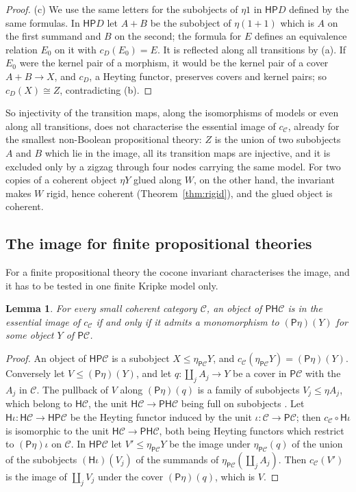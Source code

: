 \documentclass[11pt]{amsart}
\newtheorem{lem}[thm]{Lemma}
\theoremstyle{definition}
\newcommand{\PP}{\mathsf P}
\newcommand{\HH}{\mathsf H}
\newcommand{\cC}{\mathcal C}
\begin{document}
\begin{proof}
(c) We use the same letters for the subobjects of $\eta1$ in
$\HH\PP D$ defined by the same formulas. In $\HH\PP D$ let $A+B$ be the
subobject of $\eta(1+1)$ which is $A$ on the first summand and $B$ on
the second; the formula for $E$ defines an equivalence relation $E_0$
on it with $c_D(E_0)=E$. It is reflected along all transitions by (a).
If $E_0$ were the kernel pair of a morphism, it would be the kernel
pair of a cover $A+B\to X$, and $c_D$, a Heyting functor, preserves
covers and kernel pairs; so $c_D(X)\cong Z$, contradicting (b).
\end{proof}

So injectivity of the transition maps, along the isomorphisms of
models or even along all transitions, does not characterise the
essential image of $c_\cC$, already for the smallest non-Boolean
propositional theory: $Z$ is the union of two subobjects $A$ and $B$ which lie in the
image, all its transition maps are injective, and it is excluded only
by a zigzag through four nodes carrying the same model. For two copies
of a coherent object $\eta Y$ glued along $W$, on the other hand, the
invariant makes $W$ rigid, hence coherent (Theorem~\ref{thm:rigid}),
and the glued object is coherent.

\subsection*{The image for finite propositional theories}
For a finite propositional theory the cocone invariant characterises
the image, and it has to be tested in one finite Kripke model only.

\begin{lem}\label{lem:subimage}
For every small coherent category $\cC$, an object of $\PP\HH\cC$ is in
the essential image of $c_\cC$ if and only if it admits a monomorphism
to $(\PP\eta)(Y)$ for some object $Y$ of $\PP\cC$.
\end{lem}
\begin{proof}
An object of $\HH\PP\cC$ is a subobject $X\le\eta_{\PP\cC}Y$, and
$c_\cC(\eta_{\PP\cC}Y)=(\PP\eta)(Y)$. Conversely let $V\le(\PP\eta)(Y)$,
and let $q\colon\coprod_jA_j\to Y$ be a cover in $\PP\cC$ with the
$A_j$ in $\cC$. The pullback of $V$ along $(\PP\eta)(q)$ is a family of
subobjects $V_j\le\eta A_j$, which belong to $\HH\cC$, the unit
$\HH\cC\to\PP\HH\cC$ being full on subobjects \cite[A3.3]{Elephant}.
Let $\HH\iota\colon\HH\cC\to\HH\PP\cC$ be the Heyting functor induced
by the unit $\iota\colon\cC\to\PP\cC$; then $c_\cC\circ\HH\iota$ is
isomorphic to the unit $\HH\cC\to\PP\HH\cC$, both being Heyting
functors which restrict to $(\PP\eta)\iota$ on $\cC$. In $\HH\PP\cC$
let $V'\le\eta_{\PP\cC}Y$ be the image under $\eta_{\PP\cC}(q)$ of the
union of the subobjects $(\HH\iota)(V_j)$ of the summands of
$\eta_{\PP\cC}(\coprod_jA_j)$. Then $c_\cC(V')$ is the image of
$\coprod_jV_j$ under the cover $(\PP\eta)(q)$, which is $V$.
\end{proof}
\end{document}
